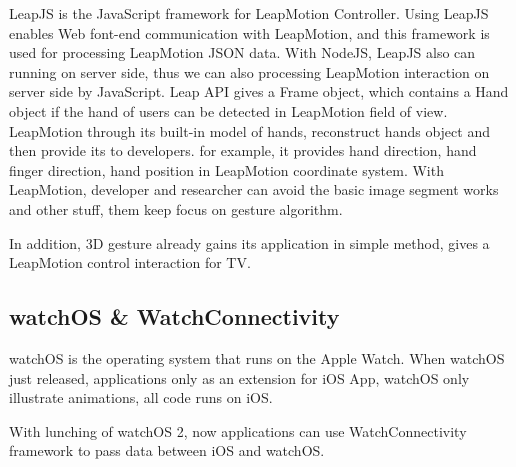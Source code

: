 LeapJS is the JavaScript framework for LeapMotion Controller.
Using LeapJS enables Web font-end communication with LeapMotion, and this framework is used for processing LeapMotion JSON data.
With NodeJS, LeapJS also can running on server side, thus we can also processing LeapMotion interaction on server side by JavaScript.
Leap API gives a Frame object, which contains a Hand object if the hand of users can be detected in LeapMotion field of view. LeapMotion through its built-in model of hands, reconstruct hands object and then provide its to developers.
for example, it provides hand direction, hand finger direction, hand position in LeapMotion coordinate system.
With LeapMotion, developer and researcher can avoid the basic image segment works and other stuff, them keep focus on gesture algorithm\cite{garber2013gestural,xusuibin2015,panjiajia2015,huhong2015,marin2014hand}.

In addition, 3D gesture already gains its application in simple method, \cite{zaicti2015free} gives a LeapMotion control interaction for TV.

\subsection{watchOS \& WatchConnectivity}

watchOS is the operating system that runs on the Apple Watch. When watchOS just released, applications only as an extension for iOS App, watchOS only illustrate animations, all code runs on iOS.

With lunching of watchOS 2, now applications can use WatchConnectivity framework to pass data between iOS and watchOS.

